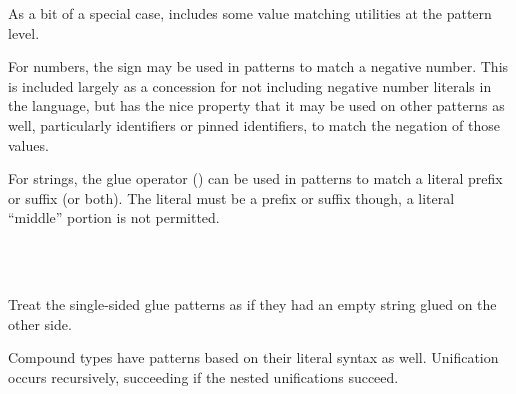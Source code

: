 As a bit of a special case, \Trilogy{} includes some value matching utilities
at the pattern level.

\begin{bnf*}
\end{bnf*}

For numbers, the \op{-} sign may be used in patterns to match a negative number.
This is included largely as a concession for not including negative number
literals in the language, but has the nice property that it may be used on
other patterns as well, particularly identifiers or pinned identifiers, to
match the negation of those values.

\begin{prooftree}
\end{prooftree}

For strings, the glue operator (\op{<>}) can be used in patterns to match
a literal prefix or suffix (or both). The literal must be a prefix or
suffix though, a literal ``middle'' portion is not permitted.

\begin{bnf*}
     \\
     \\
\end{bnf*}

Treat the single-sided glue patterns as if they had an empty string
glued on the other side.

\begin{prooftree}
\end{prooftree}

Compound types have patterns based on their literal syntax as well.
Unification occurs recursively, succeeding if the nested unifications
succeed.

